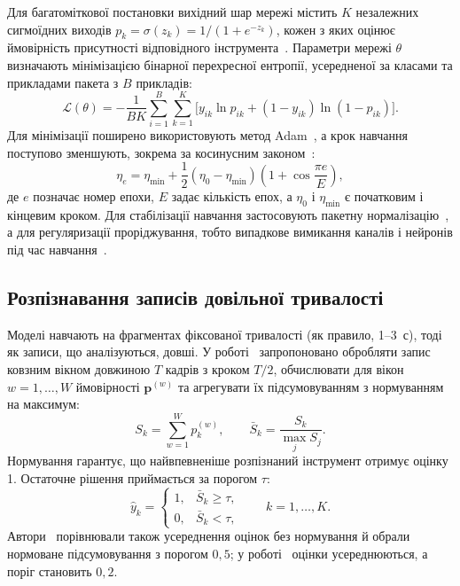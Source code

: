 Для багатоміткової постановки вихідний шар мережі містить $K$ незалежних
сигмоїдних виходів $p_k = \sigma(z_k) = 1/(1 + e^{-z_k})$, кожен з яких
оцінює ймовірність присутності відповідного
інструмента~\cite{tsoumakas2007,goodfellow2016}. Параметри мережі
$\theta$ визначають мінімізацією бінарної перехресної ентропії,
усередненої за класами та прикладами пакета з $B$ прикладів:
\begin{equation}
    \mathcal{L}(\theta) = -\frac{1}{BK} \sum_{i=1}^{B} \sum_{k=1}^{K}
    \Big[ y_{ik} \ln p_{ik} + (1 - y_{ik}) \ln(1 - p_{ik}) \Big].
    \label{eq:bce}
\end{equation}
Для мінімізації поширено використовують метод Adam~\cite{kingma2015}, а
крок навчання поступово зменшують, зокрема за косинусним
законом~\cite{loshchilov2017}:
\begin{equation}
    \eta_e = \eta_{\min} + \frac{1}{2}(\eta_0 - \eta_{\min})
    \left(1 + \cos\frac{\pi e}{E}\right),
    \label{eq:cosine}
\end{equation}
де $e$ позначає номер епохи, $E$ задає кількість епох, а $\eta_0$ і
$\eta_{\min}$ є початковим і кінцевим кроком. Для стабілізації навчання
застосовують пакетну нормалізацію~\cite{ioffe2015}, а для регуляризації
проріджування, тобто випадкове вимикання каналів і нейронів під час
навчання~\cite{srivastava2014}.

\subsection{Розпізнавання записів довільної тривалості}
\label{sec:inference}

Моделі навчають на фрагментах фіксованої тривалості (як правило, 1--3~с),
тоді як записи, що аналізуються, довші. У роботі~\cite{han2017}
запропоновано обробляти запис ковзним вікном довжиною $T$ кадрів з кроком
$T/2$, обчислювати для вікон $w = 1, \ldots, W$ ймовірності
$\mathbf{p}^{(w)}$ та агрегувати їх підсумовуванням з нормуванням на
максимум:
\begin{equation}
    S_k = \sum_{w=1}^{W} p^{(w)}_k, \qquad
    \bar{S}_k = \frac{S_k}{\max_{j} S_j}.
    \label{eq:s2}
\end{equation}
Нормування гарантує, що найвпевненіше розпізнаний інструмент отримує
оцінку 1. Остаточне рішення приймається за порогом $\tau$:
\begin{equation}
    \hat{y}_k =
    \begin{cases}
        1, & \bar{S}_k \geq \tau, \\
        0, & \bar{S}_k < \tau,
    \end{cases}
    \qquad k = 1, \ldots, K.
    \label{eq:decision}
\end{equation}
Автори~\cite{han2017} порівнювали також усереднення оцінок без нормування
й обрали нормоване підсумовування з порогом $0{,}5$; у
роботі~\cite{pons2017} оцінки усереднюються, а поріг становить $0{,}2$.

